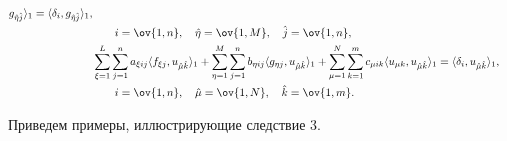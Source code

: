 \begin{cor}
\begin{align*}
g_{\Hat\eta\Hat j}\ra_1 =\la \delta_i,


g_{\Hat\eta\Hat j}\ra_1,\\


&\qquad i=\ov{1,n},\quad


\Hat\eta=\ov{1,M},\quad


\Hat j=\ov{1,n},\\


%


&\sum_{\xi=1}^L \sum_{j=1}^n a_{\xi ij}\la f_{\xi j},


u_{\Hat\mu\Hat k}\ra_1 +


\sum_{\eta=1}^M \sum_{j=1}^n b_{\eta ij}\la g_{\eta j},


u_{\Hat\mu\Hat k}\ra_1 +


\sum_{\mu=1}^N \sum_{k=1}^m c_{\mu ik}\la u_{\mu k},


u_{\Hat\mu\Hat k}\ra_1 =\la \delta_i,


u_{\Hat\mu\Hat k}\ra_1 ,\\


&\qquad i=\ov{1,n},\quad


\Hat\mu=\ov{1,N},\quad


\Hat k=\ov{1,m}.


\end{align*}


\end{cor}





Приведем примеры, иллюстрирующие следствие 3.






